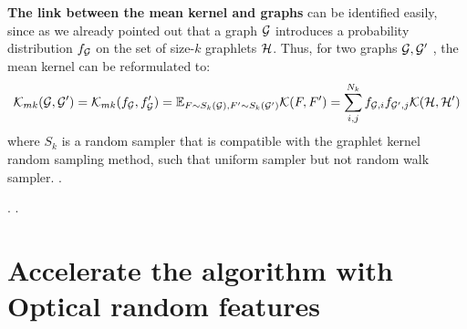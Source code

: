 \textbf{The link between the mean kernel and graphs} can be identified easily, since as we already pointed out that a graph $\mathcal{G}$ introduces a probability distribution $f_{\mathcal{G}}$ on the set of size-$k$ graphlets $\mathcal{H}$. Thus, for two graphs $\mathcal{G},\mathcal{G}'$ , the mean kernel can be reformulated to:
\begin{equation}
\label{eq:mean_kernel_graphs}
\mathcal{K}_{mk}(\mathcal{G},\mathcal{G}') = \mathcal{K}_{mk}(f_{\mathcal{G}},f_{\mathcal{G}}')= \mathbb{E}_{F \sim S_k(\mathcal{G}), F' \sim S_k(\mathcal{G}')} \mathcal{K}(F,F')=\sum_{i,j}^{N_k}f_{\mathcal{G},i}f_{\mathcal{G}',j}\mathcal{K}(\mathcal{H},\mathcal{H}') 
\end{equation}
where $S_k$ is a random sampler that is compatible with the graphlet kernel random sampling method, such that uniform sampler but not random walk sampler.
.

.
.




\section{Accelerate the algorithm with Optical random features}


